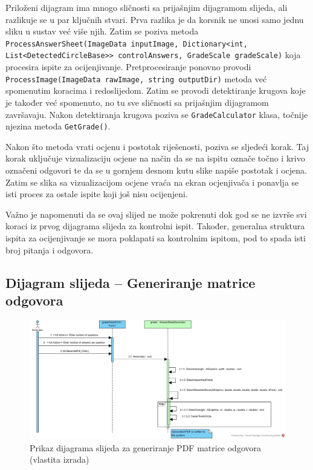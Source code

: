 \documentclass{foi}
\begin{document}
Priloženi dijagram ima mnogo sličnosti sa prijašnjim dijagramom slijeda, ali razlikuje se u par ključnih stvari. Prva razlika je da korsnik ne unosi samo jednu sliku u sustav već više njih. Zatim se poziva metoda \texttt{ProcessAnswerSheet(ImageData inputImage, Dictionary<int, List<DetectedCircleBase>> controlAnswers, GradeScale gradeScale)} koja procesira ispite za ocijenjivanje. Pretprocesiranje ponovno provodi \texttt{ProcessImage(ImageData rawImage, string outputDir)} metoda već spomenutim koracima i redoslijedom. Zatim se provodi detektiranje krugova koje je također već spomenuto, no tu sve sličnosti sa prijašnjim dijagramom završavaju. Nakon detektiranja krugova poziva se \texttt{GradeCalculator} klasa, točnije njezina metoda \texttt{GetGrade()}.

Nakon što metoda vrati ocjenu i postotak riješenosti, poziva se sljedeći korak. Taj korak uključuje vizualizaciju ocjene na način da se na ispitu označe točno i krivo označeni odgovori te da se u gornjem desnom kutu slike napiše postotak i ocjena. Zatim se slika sa vizualizacijom ocjene vraća na ekran ocjenjivača i ponavlja se isti proces za ostale ispite koji još nisu ocijenjeni.

Važno je napomenuti da se ovaj slijed ne može pokrenuti dok god se ne izvrše svi koraci iz prvog dijagrama slijeda za kontrolni ispit. Također, generalna struktura ispita za ocijenjivanje se mora poklapati sa kontrolnim ispitom, pod to spada isti broj pitanja i odgovora.

\subsection{Dijagram slijeda – Generiranje matrice odgovora}

\begin{figure}[H]
\centering
\includegraphics[width=1.0\linewidth]{slike/sequence3.jpg}
\caption{Prikaz dijagrama slijeda za generiranje PDF matrice odgovora (vlastita izrada)}
\end{figure}
\end{document}
